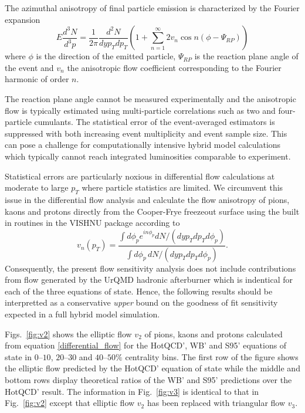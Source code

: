 \documentclass[aps,prc,reprint,amsmath,nofootinbib,superscriptaddress]{revtex4-1}
\begin{document}
The azimuthal anisotropy of final particle emission is characterized by the Fourier expansion
\begin{equation}
 E \frac{d^3N}{d^3p} = \frac{1}{2\pi} \frac{d^2N}{dy p_T dp_T} \left(1 + \sum\limits_{n=1}^\infty 2 v_n \cos n(\phi - \Psi_{RP}) \right)
\end{equation}
where $\phi$ is the direction of the emitted particle, $\Psi_{RP}$ is the reaction plane angle of the event and $v_n$ the anisotropic flow coefficient corresponding to the Fourier harmonic of order $n$.

The reaction plane angle cannot be measured experimentally and the anisotropic flow is typically estimated using multi-particle correlations such as two and four-particle cumulants. The statistical error of the 
event-averaged estimators is suppressed with both increasing event multiplicity and event sample size. This can pose a challenge for computationally intensive hybrid model calculations which typically cannot 
reach integrated luminosities comparable to experiment. 

Statistical errors are particularly noxious in differential flow calculations at moderate to large $p_T$ where particle statistics are limited. We circumvent this issue in the differential flow 
analysis and calculate the flow anisotropy of pions, kaons and protons directly from the Cooper-Frye freezeout surface using the built in routines in the VISHNU package according to
\begin{equation}
 \label{differential_flow}
 v_n(p_T) = \frac{\int d\phi_p e^{i n \phi_p} dN/(dy p_T dp_T d\phi_p)}{\int d\phi_p\, dN/(dy p_T dp_T d\phi_p)}.
\end{equation}
Consequently, the present flow sensitivity analysis does not include contributions from flow generated by the UrQMD hadronic afterburner which is indentical for each of the three equations of state. Hence, the following
results should be interpretted as a conservative \emph{upper} bound on the goodness of fit sensitivity expected in a full hybrid model simulation.

Figs.~\ref{fig:v2} shows the elliptic flow $v_2$ of pions, kaons and protons calculated from equation \eqref{differential_flow} for the HotQCD', WB' and S95' equations of state in $0$--$10$, $20$--$30$ and $40$--$50\%$ centrality bins. 
The first row of the figure shows the elliptic flow predicted by the HotQCD' equation of state while the middle and bottom rows display theoretical ratios of the WB' and S95' predictions over the HotQCD' result. The information
in Fig.~\ref{fig:v3} is identical to that in Fig.~\ref{fig:v2} except that elliptic flow $v_2$ has been replaced with triangular flow $v_3$.
\end{document}
